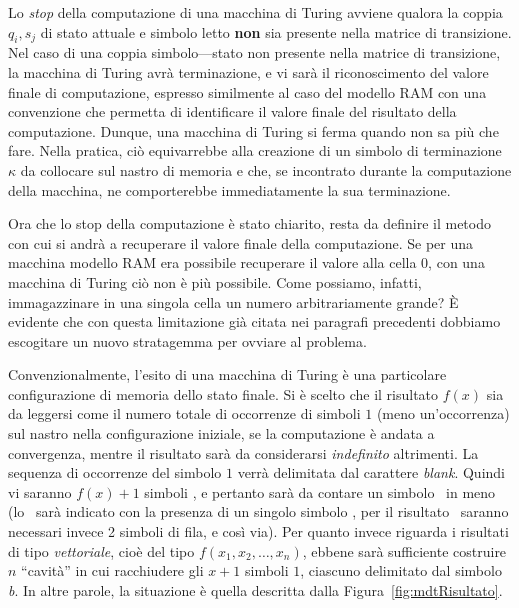 \documentclass[10pt]{\classname}
\theoremstyle{definition}
\theoremstyle{definition}
\theoremstyle{definition}
\theoremstyle{definition}
\begin{document}
Lo \emph{stop} della computazione di una macchina di Turing avviene qualora la
coppia $q_i, s_j$ di stato attuale e simbolo letto \textbf{non} sia presente
nella matrice di transizione. Nel caso di una coppia simbolo---stato non
presente nella matrice di transizione, la macchina di Turing avrà terminazione,
e vi sarà il riconoscimento del valore finale di computazione, espresso
similmente al caso del modello RAM con una convenzione che permetta di
identificare il valore finale del risultato della computazione. Dunque, una
macchina di Turing si ferma quando non sa più che fare. Nella pratica, ciò
equivarrebbe alla creazione di un simbolo di terminazione $\kappa$ da collocare
sul nastro di memoria e che, se incontrato durante la computazione della
macchina, ne comporterebbe immediatamente la sua terminazione.

Ora che lo stop della computazione è stato chiarito, resta da definire il metodo
con cui si andrà a recuperare il valore finale della computazione. Se per una
macchina modello RAM era possibile recuperare il valore alla cella 0, con una
macchina di Turing ciò non è più possibile. Come possiamo, infatti,
immagazzinare in una singola cella un numero arbitrariamente grande? È evidente
che con questa limitazione già citata nei paragrafi precedenti dobbiamo
escogitare un nuovo stratagemma per ovviare al problema.

Convenzionalmente, l'esito di una macchina di Turing è una particolare
configurazione di memoria dello stato finale. Si è scelto che
il risultato $f(x)$ sia da leggersi come il numero totale di occorrenze di simboli $1$
(meno un'occorrenza) sul nastro nella configurazione iniziale, se la computazione è
andata a convergenza, mentre il risultato sarà da considerarsi \emph{indefinito}
altrimenti. La sequenza di occorrenze del simbolo $1$ verrà delimitata dal
carattere \emph{blank}. Quindi vi saranno $f(x) + 1$ simboli
\textquotesingle, e pertanto sarà da contare un simbolo
\textquotesingle\ in meno (lo
\textquotesingle\   sarà indicato con la presenza di un
singolo simbolo \textquotesingle, per il risultato
\textquotesingle\ saranno necessari invece 2 simboli
\textquotesingle di fila, e così via). Per quanto invece
riguarda i risultati di tipo \emph{vettoriale}, cioè del tipo
$f(x_1,x_2,\dots,x_n)$, ebbene sarà sufficiente costruire $n$ ``cavità'' in
cui racchiudere gli $x+1$ simboli $1$, ciascuno delimitato dal simbolo
\emph{b}. In altre parole, la situazione è quella descritta dalla
Figura~\ref{fig:mdtRisultato}.
\end{document}
